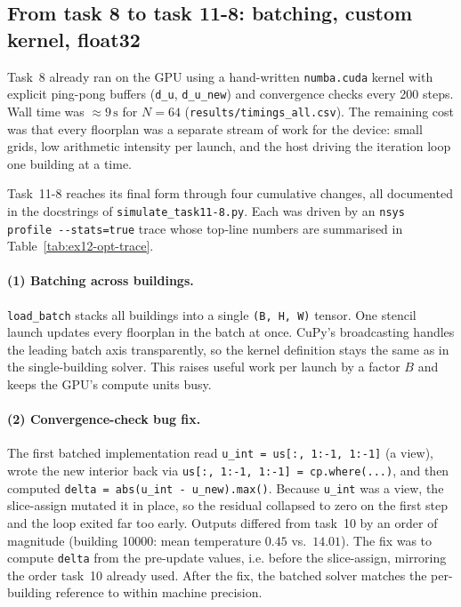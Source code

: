 \subsection{From task 8 to task 11-8: batching, custom kernel, float32}

Task~8 already ran on the GPU using a hand-written
\verb|numba.cuda| kernel with explicit ping-pong buffers
(\verb|d_u|, \verb|d_u_new|) and convergence checks every 200 steps.
Wall time was ${\approx}9\,\text{s}$ for $N = 64$
(\verb|results/timings_all.csv|).
The remaining cost was that every floorplan was a separate
stream of work for the device: small grids, low arithmetic intensity
per launch, and the host driving the iteration loop one building at
a time.

Task~11-8 reaches its final form through four cumulative changes,
all documented in the docstrings of \verb|simulate_task11-8.py|.
Each was driven by an \verb|nsys profile --stats=true| trace whose
top-line numbers are summarised in Table~\ref{tab:ex12-opt-trace}.

\paragraph{(1) Batching across buildings.}
\verb|load_batch| stacks all buildings into a single
\verb|(B, H, W)| tensor. One stencil launch updates every floorplan
in the batch at once. CuPy's broadcasting handles the leading batch
axis transparently, so the kernel definition stays the same as in
the single-building solver. This raises useful work per launch by a
factor $B$ and keeps the GPU's compute units busy.

\paragraph{(2) Convergence-check bug fix.}
The first batched implementation read
\verb|u_int = us[:, 1:-1, 1:-1]| (a view), wrote the new interior
back via \verb|us[:, 1:-1, 1:-1] = cp.where(...)|, and then
computed \verb|delta = abs(u_int - u_new).max()|.
Because \verb|u_int| was a view, the slice-assign mutated it in
place, so the residual collapsed to zero on the first step and the
loop exited far too early. Outputs differed from task~10 by an order
of magnitude (building 10000: mean temperature $0.45$ vs.~$14.01$).
The fix was to compute \verb|delta| from the pre-update values, i.e.
before the slice-assign, mirroring the order task~10 already used.
After the fix, the batched solver matches the per-building reference
to within machine precision.

